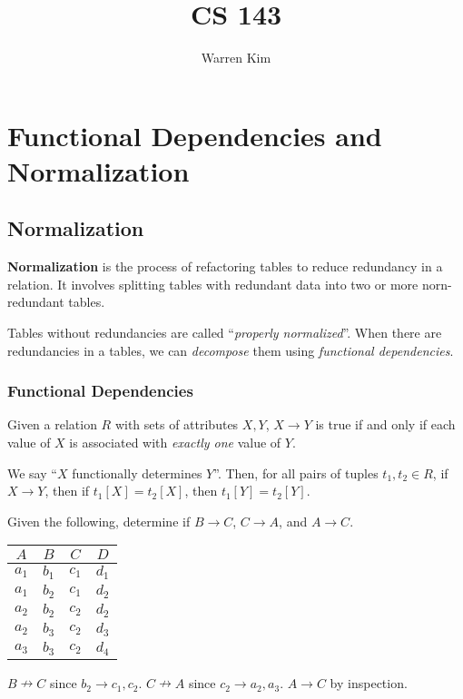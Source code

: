 \documentclass{report}
\title{CS 143}
\author{Warren Kim}
\date{}
\newenvironment{definition}[1]{\begin{tcolorbox}[title={Definition: #1}]}{\end{tcolorbox}}
\newenvironment{example}{\begin{tcolorbox}[title={Example},colback=green!5!white,colframe=black!75!green]}{\end{tcolorbox}}
\renewcommand{\bf}[1]{\textbf{{#1}}}
\renewcommand{\it}[1]{\textit{{#1}}}
\begin{document}
\maketitle

\tableofcontents
\newpage

\chapter[Functional Dependencies and Normalization]{Functional Dependencies and \\ Normalization}
\section{Normalization}
\begin{definition}{Normalization}
    \bf{Normalization} is the process of refactoring tables to reduce redundancy
    in a relation. It involves splitting tables with redundant data into two or
    more norn-redundant tables.
\end{definition}

Tables without redundancies are called ``\it{properly normalized}''. When there
are redundancies in a tables, we can \it{decompose} them using
\it{functional dependencies}.

\subsection{Functional Dependencies}
\begin{definition}{Functional Dependency}
    Given a relation $R$ with sets of attributes $X, Y$, $X \to Y$ is true if
    and only if each value of $X$ is associated with \it{exactly one} value of
    $Y$.
\end{definition}

We say ``$X$ functionally determines $Y$''. Then, for all pairs of tuples $t_1,
t_2 \in R$, if $X \to Y$, then if $t_1[X] = t_2[X]$, then $t_1[Y] = t_2[Y]$.
\begin{example}
    Given the following, determine if $B \to C$, $C \to A$, and $A \to C$.

    {
        \centering
        \begin{tabular}{c|c|c|c}
            $A$ & $B$ & $C$ & $D$ \\
            \hline
            $a_1$ & $b_1$ & $c_1$ & $d_1$ \\
            $a_1$ & $b_2$ & $c_1$ & $d_2$ \\
            $a_2$ & $b_2$ & $c_2$ & $d_2$ \\
            $a_2$ & $b_3$ & $c_2$ & $d_3$ \\
            $a_3$ & $b_3$ & $c_2$ & $d_4$ \\
        \end{tabular}
        \par
    }

    $B \nrightarrow C$ since $b_2 \to c_1, c_2$. $C \nrightarrow A$ since
    $c_2 \to a_2, a_3$. $A \to C$ by inspection.
\end{example}
\end{document}
